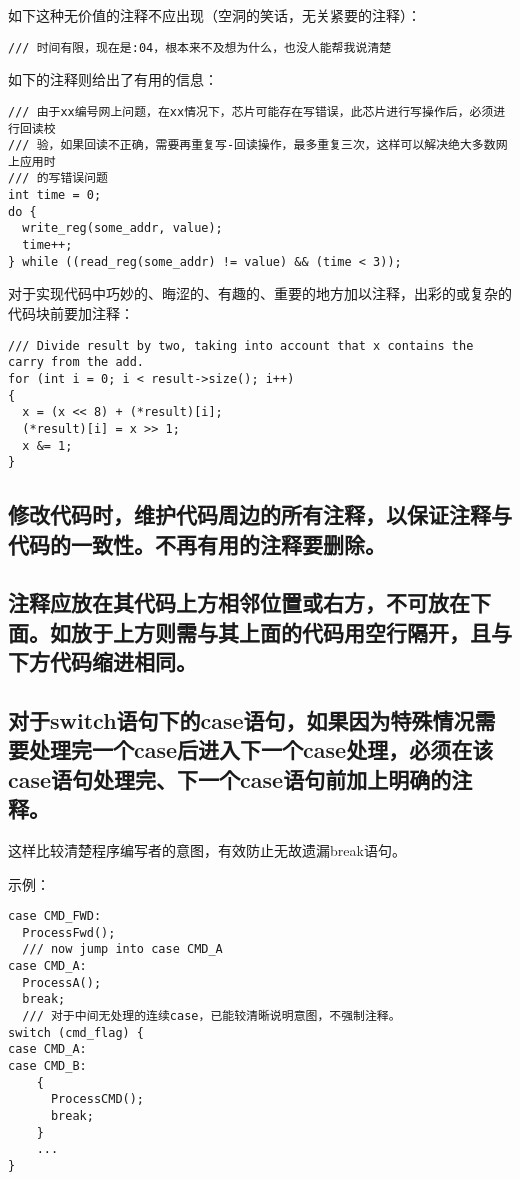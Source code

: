 如下这种无价值的注释不应出现（空洞的笑话，无关紧要的注释）：
\begin{verbatim}
/// 时间有限，现在是:04，根本来不及想为什么，也没人能帮我说清楚
\end{verbatim}

如下的注释则给出了有用的信息：
\begin{verbatim}
/// 由于xx编号网上问题，在xx情况下，芯片可能存在写错误，此芯片进行写操作后，必须进行回读校
/// 验，如果回读不正确，需要再重复写-回读操作，最多重复三次，这样可以解决绝大多数网上应用时
/// 的写错误问题
int time = 0;
do {
  write_reg(some_addr, value);
  time++;
} while ((read_reg(some_addr) != value) && (time < 3));
\end{verbatim}

对于实现代码中巧妙的、晦涩的、有趣的、重要的地方加以注释，出彩的或复杂的代码块前要加注释：
\begin{verbatim}
/// Divide result by two, taking into account that x contains the carry from the add.
for (int i = 0; i < result->size(); i++)
{
  x = (x << 8) + (*result)[i];
  (*result)[i] = x >> 1;
  x &= 1;
}
\end{verbatim}


\subsection{修改代码时，维护代码周边的所有注释，以保证注释与代码的一致性。不再有用的注释要删除。}


\subsection{注释应放在其代码上方相邻位置或右方，不可放在下面。如放于上方则需与其上面的代码用空行隔开，且与下方代码缩进相同。}


\subsection{对于switch语句下的case语句，如果因为特殊情况需要处理完一个case后进入下一个case处理，必须在该case语句处理完、下一个case语句前加上明确的注释。}
这样比较清楚程序编写者的意图，有效防止无故遗漏break语句。

示例：
\begin{verbatim}
case CMD_FWD:
  ProcessFwd();
  /// now jump into case CMD_A
case CMD_A:
  ProcessA();
  break;
  /// 对于中间无处理的连续case，已能较清晰说明意图，不强制注释。
switch (cmd_flag) {
case CMD_A:
case CMD_B:
    {
      ProcessCMD();
      break;
    }
    ...
}
\end{verbatim}



